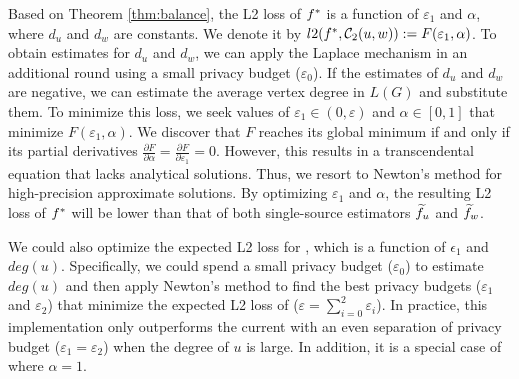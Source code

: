 {Based on Theorem \ref{thm:balance}, the L2 loss of $f^*$ is a function of $\varepsilon_1$ and $\alpha$, where $d_u$ and $d_w$ are constants. 
We denote it by $l2(f^*, \mathcal{C}_2(u,w)) := F(\varepsilon_1, \alpha)$. 
To obtain estimates for $d_u$ and $d_w$, we can apply the Laplace mechanism in an additional round using a small privacy budget ($\varepsilon_0$). 
If the estimates of $d_u$ and $d_w$ are negative, we can estimate the average vertex degree in $L(G)$ and substitute them.} 
To minimize this loss, we seek values of $\varepsilon_1 \in (0, \varepsilon)$ and $\alpha \in [0,1]$ that minimize $F(\varepsilon_1, \alpha)$. 
We discover that $F$ reaches its global minimum if and only if its partial derivatives $\frac{\partial F}{\partial \alpha} = \frac{\partial F}{\partial \varepsilon_1} =0$. 
However, this results in a transcendental equation that lacks analytical solutions. 
Thus, we resort to Newton's method \cite{galantai2000theory} for high-precision approximate solutions. 
By optimizing $\varepsilon_1$ and $\alpha$, the resulting L2 loss of $f^*$ will be lower than that of both single-source estimators $\widetilde{f}_u$ and $\widetilde{f}_w$. 

{
We could also optimize the expected L2 loss for \advss, which is a function of $\epsilon_1$ and $deg(u)$. 
Specifically, we could spend a small privacy budget ($\varepsilon_0$) to estimate $deg(u)$ and then apply Newton's method to find the best privacy budgets ($\varepsilon_1$ and $\varepsilon_2$) that minimize the expected L2 loss of \advss ($\varepsilon = \sum_{i=0}^2 \varepsilon_i $). 
In practice, this implementation only outperforms the current \advss with an even separation of privacy budget ($\varepsilon_1 = \varepsilon_2$) when the degree of $u$ is large. 
In addition, it is a special case of \advds where $\alpha =1$. 
}


